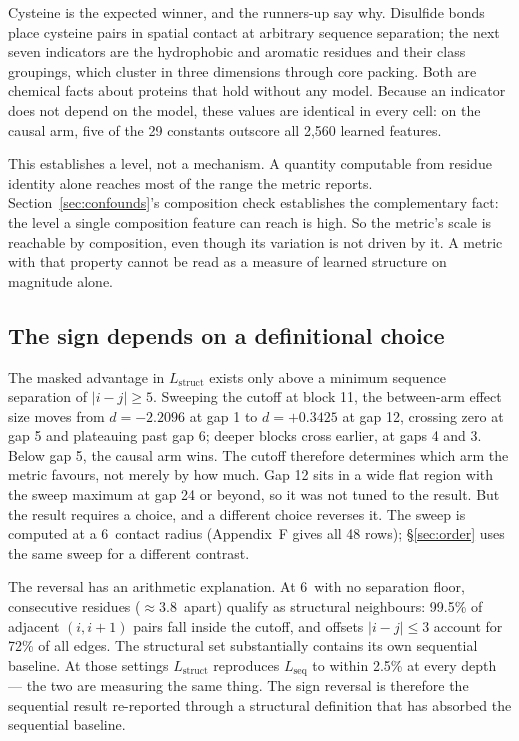 \documentclass{article} %
\newcommand{\red}[1]{\textcolor{red}{#1}}
\newcommand{\opentag}[1]{\textcolor{red}{\textsuperscript{[\ref{#1}]}}}
\newcommand{\pend}[2]{\red{#1}\opentag{#2}}
\renewcommand{\red}[1]{#1}
\renewcommand{\opentag}[1]{}
\renewcommand{\pend}[2]{#1}
\newcommand{\Lstruct}{\ensuremath{L_{\mathrm{struct}}}}
\newcommand{\Lseq}{\ensuremath{L_{\mathrm{seq}}}}
\newcommand{\angstrom}{\text{\AA}}
\begin{document}
Cysteine is the expected winner, and the runners-up say why. Disulfide bonds place cysteine pairs
in spatial contact at arbitrary sequence separation; the next seven indicators are the hydrophobic
and aromatic residues and their class groupings, which cluster in three dimensions through core
packing. Both are chemical facts about proteins that hold without any model. Because an indicator
does not depend on the model, these values are identical in every cell: on the causal arm, five of
the 29 constants outscore all 2{,}560 learned features.

This establishes a level, not a mechanism. A quantity computable from residue identity alone
reaches most of the range the metric reports. Section~\ref{sec:confounds}'s composition check
establishes the complementary fact: the level a single composition feature can reach is high. So
the metric's scale is reachable by composition, even though its variation is not driven by it. A
metric with that property cannot be read as a measure of learned structure on magnitude alone.

\subsection{The sign depends on a definitional choice}
\label{sec:cutoff}

The masked advantage in \Lstruct{} exists only above a minimum sequence separation of $|i - j| \ge
5$. Sweeping the cutoff at block 11, the between-arm effect size moves from $d = -2.2096$ at gap 1
to $d = +0.3425$ at gap 12, crossing zero at gap 5 and plateauing past gap 6; deeper blocks cross
earlier, at gaps 4 and 3. Below gap 5, the causal arm wins. The cutoff therefore determines which
arm the metric favours, not merely by how much. Gap 12 sits in a wide flat region with the sweep
maximum at gap 24 or beyond, so it was not tuned to the result. But the result requires a
choice, and a different choice reverses it. The sweep is computed at a 6\,\angstrom{} contact
radius (Appendix~F gives all 48 rows); \S\ref{sec:order} uses the same sweep for a different
contrast.

The reversal has an arithmetic explanation. At 6\,\angstrom{} with no separation floor, consecutive
residues ($\approx 3.8$\,\angstrom{} apart) qualify as structural neighbours: 99.5\% of adjacent $(i, i+1)$
pairs fall inside the cutoff, and offsets $|i-j| \le 3$ account for 72\% of all edges. The
structural set substantially contains its own sequential baseline. \pend{At those settings
\Lstruct{} reproduces \Lseq{} to within 2.5\% at every depth}{c:agreement} --- the two are
measuring the same thing. The sign reversal is therefore the sequential result re-reported through
a structural definition that has absorbed the sequential baseline.
\end{document}
